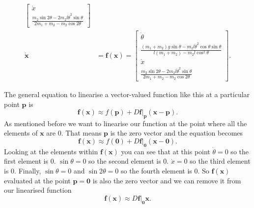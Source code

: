 \documentclass{article}
\renewcommand{\vec}[1]{\boldsymbol{\mathbf{#1}}}
\newcommand{\dvec}[1]{\dot{\vec{#1}}}
\begin{document}
\begin{align*}
\begin{bmatrix}
                                         \dot{x}                                                                                                              \\
                                         \frac{m_2 \sin 2 \theta - 2 m_2 l \dot{\theta}^2 \sin \theta}{2 m_1 + m_2 - m_2 \cos 2 \theta}
                                       \end{bmatrix}    \\
  \dvec{x}         & = \vec{f}(\vec{x}) = \begin{bmatrix}
                                            \dot{\theta}                                                                                                         \\
                                            \frac{(m_1 + m_2) g \sin \theta - m_2 l \dot{\theta}^2 \cos \theta \sin \theta}{l (m_1 + m_2) - m_2 l \cos^2 \theta} \\
                                            \dot{x}                                                                                                              \\
                                            \frac{m_2 \sin 2 \theta - 2 m_2 l \dot{\theta}^2 \sin \theta}{2 m_1 + m_2 - m_2 \cos 2 \theta}
                                          \end{bmatrix}.
\end{align*}

The general equation to linearise a vector-valued function like this at a particular point $\vec{p}$ is \[\vec{f}(\vec{x}) \approx f(\vec{p}) + D \vec{f}|_{\vec{p}} (\vec{x} - \vec{p}).\] As mentioned before we want to linearise our function at the point where all the elements of $\vec{x}$ are $0$. That means $\vec{p}$ is the zero vector and the equation becomes \[\vec{f}(\vec{x}) \approx f(\vec{0}) + D \vec{f}|_{\vec{0}} (\vec{x} - \vec{0}).\] Looking at the elements within $\vec{f}(\vec{x})$ you can see that at this point $\dot{\theta} = 0$ so the first element is $0$. $\sin \theta = 0$ so the second element is $0$. $\dot{x} = 0$ so the third element is $0$. Finally, $\sin \theta = 0$ and $\sin 2 \theta = 0$ so the fourth element is $0$. So $\vec{f}(\vec{x})$ evaluated at the point $\vec{p} = \vec{0}$ is also the zero vector and we can remove it from our linearised function \[\vec{f}(\vec{x}) \approx D \vec{f}|_{\vec{0}} \vec{x}.\]
\end{document}
